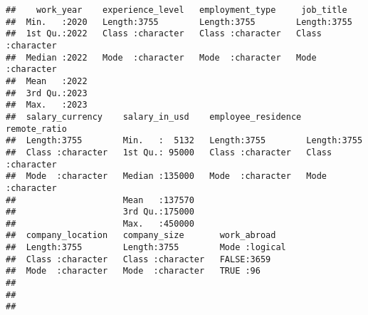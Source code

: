 \documentclass[
]{article}
\begin{document}
\begin{verbatim}
##    work_year    experience_level   employment_type     job_title        
##  Min.   :2020   Length:3755        Length:3755        Length:3755       
##  1st Qu.:2022   Class :character   Class :character   Class :character  
##  Median :2022   Mode  :character   Mode  :character   Mode  :character  
##  Mean   :2022                                                           
##  3rd Qu.:2023                                                           
##  Max.   :2023                                                           
##  salary_currency    salary_in_usd    employee_residence remote_ratio      
##  Length:3755        Min.   :  5132   Length:3755        Length:3755       
##  Class :character   1st Qu.: 95000   Class :character   Class :character  
##  Mode  :character   Median :135000   Mode  :character   Mode  :character  
##                     Mean   :137570                                        
##                     3rd Qu.:175000                                        
##                     Max.   :450000                                        
##  company_location   company_size       work_abroad    
##  Length:3755        Length:3755        Mode :logical  
##  Class :character   Class :character   FALSE:3659     
##  Mode  :character   Mode  :character   TRUE :96       
##                                                       
##                                                       
## 
\end{verbatim}
\end{document}
